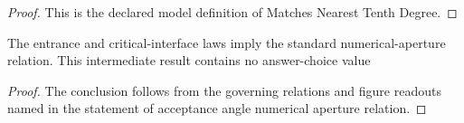 \begin{proof}
  This is the declared model definition of Matches Nearest Tenth Degree.
\end{proof}
\begin{lemma}
  \label{lem:physics:phyx-mini-0098:phyxminiproblems-problemphyxmini0098-acceptance-angle-numerical-aperture-relation}
  The entrance and critical-interface laws imply the standard numerical-aperture relation. This intermediate result contains no answer-choice value
\end{lemma}
\begin{proof}
  The conclusion follows from the governing relations and figure readouts named in the statement of acceptance angle numerical aperture relation.
\end{proof}
